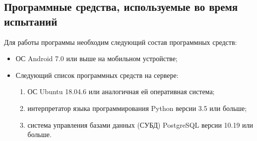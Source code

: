 \documentclass[a4paper,12pt]{article}
\begin{document}
  \subsection{Программные средства, используемые во время испытаний}
  Для работы программы необходим следующий состав программных средств:
  \begin{itemize}
    \item ОС Android 7.0 или выше на мобильном устройстве;
    \item Следующий список программных средств на сервере:
    \begin{enumerate}
      \item ОС Ubuntu 18.04.6 или аналогичная ей оперативная система;
      \item интерпретатор языка программирования Python версии 3.5 или больше;
      \item система управления базами данных (СУБД) PostgreSQL версии 10.19 или больше.
    \end{enumerate}
  \end{itemize}
\end{document}
